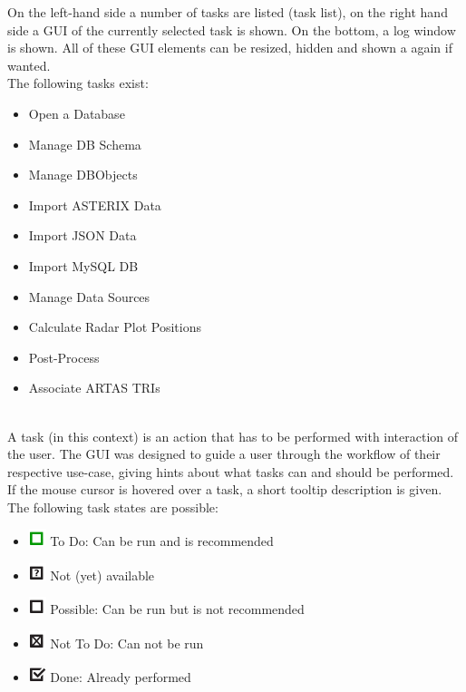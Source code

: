 On the left-hand side a number of tasks are listed (task list), on the right hand side a GUI of the currently selected task is shown. On the bottom, a log window is shown. All of these GUI elements can be resized, hidden and shown a again if wanted. \\


The following tasks exist:
\begin{itemize}
 \item Open a Database
 \item Manage DB Schema
 \item Manage DBObjects
 \item Import ASTERIX Data
 \item Import JSON Data
 \item Import MySQL DB
 \item Manage Data Sources
 \item Calculate Radar Plot Positions
 \item Post-Process
 \item Associate ARTAS TRIs
\end{itemize}
\  \\

A task (in this context) is an action that has to be performed with interaction of the user. The GUI was designed to guide a user through the workflow of their respective use-case, giving hints about what tasks can and should be performed. \\

If the mouse cursor is hovered over a task, a short tooltip description is given. \\

The following task states are possible:

\begin{itemize}
 \item \includegraphics[width=0.5cm]{../../data/icons/todo.png} To Do: Can be run and is recommended
 \item \includegraphics[width=0.5cm]{../../data/icons/todo_maybe.png} Not (yet) available
 \item \includegraphics[width=0.5cm]{../../data/icons/not_recommended.png} Possible: Can be run but is not recommended
 \item \includegraphics[width=0.5cm]{../../data/icons/not_todo.png} Not To Do: Can not be run
 \item \includegraphics[width=0.5cm]{../../data/icons/done.png} Done: Already performed
\end{itemize}
\  \\

